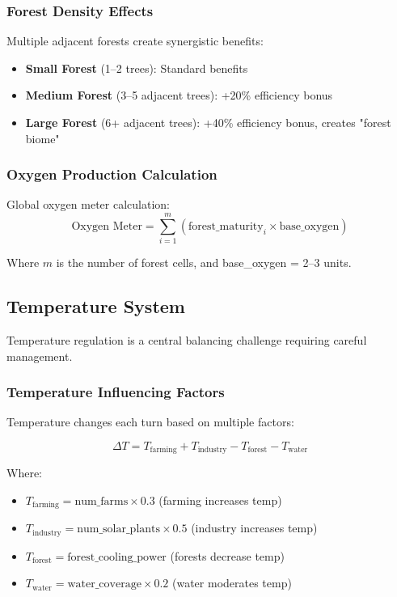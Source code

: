 \documentclass[12pt,a4paper]{article}
\begin{document}
\subsubsection{Forest Density Effects}

Multiple adjacent forests create synergistic benefits:
\begin{itemize}
    \item \textbf{Small Forest} (1--2 trees): Standard benefits
    \item \textbf{Medium Forest} (3--5 adjacent trees): +20\% efficiency bonus
    \item \textbf{Large Forest} (6+ adjacent trees): +40\% efficiency bonus, creates "forest biome"
\end{itemize}

\subsubsection{Oxygen Production Calculation}

Global oxygen meter calculation:
\begin{equation}
\text{Oxygen Meter} = \sum_{i=1}^{m} (\text{forest\_maturity}_i \times \text{base\_oxygen})
\end{equation}

Where $m$ is the number of forest cells, and base\_oxygen = 2--3 units.

\subsection{Temperature System}

Temperature regulation is a central balancing challenge requiring careful management.

\subsubsection{Temperature Influencing Factors}

Temperature changes each turn based on multiple factors:

\begin{equation}
\Delta T = T_{\text{farming}} + T_{\text{industry}} - T_{\text{forest}} - T_{\text{water}}
\end{equation}

Where:
\begin{itemize}
    \item $ T_{\text{farming}} = \text{num\_farms} \times 0.3 $ (farming increases temp)
    \item $ T_{\text{industry}} = \text{num\_solar\_plants} \times 0.5 $ (industry increases temp)
    \item $ T_{\text{forest}} = \text{forest\_cooling\_power} $ (forests decrease temp)
    \item $ T_{\text{water}} = \text{water\_coverage} \times 0.2 $ (water moderates temp)
\end{itemize}
\end{document}
